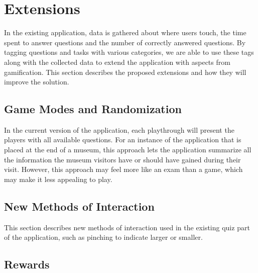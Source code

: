 \section{Extensions}

In the existing application, data is gathered about where users touch, the time spent to answer questions and the number of correctly answered questions. By tagging questions and tasks with various categories, we are able to use these tags along with the collected data to extend the application with aspects from gamification. This section describes the proposed extensions and how they will improve the solution.


\subsection{Game Modes and Randomization}

In the current version of the application, each playthrough will present the players with all available questions. For an instance of the application that is placed at the end of a museum, this approach lets the application summarize all the information the museum visitors have or should have gained during their visit. However, this approach may feel more like an exam than a game, which may make it less appealing to play.


\subsection{New Methods of Interaction}

This section describes new methods of interaction used in the existing quiz part of the application, such as pinching to indicate larger or smaller.


\subsection{Rewards}

